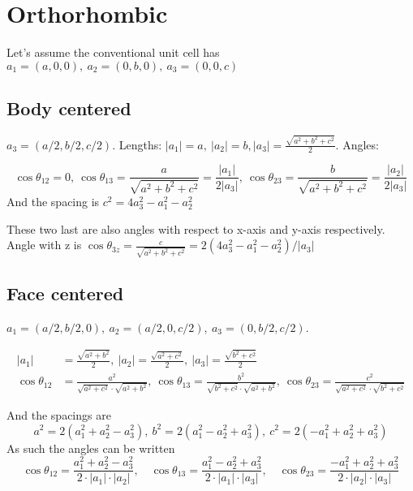 \documentclass[a4paper,10pt]{article} 	%
\numberwithin{equation}{section}
\begin{document}
	\section{Orthorhombic}
	Let's assume the conventional unit cell has $a_1 = (a,0,0),\ a_2 = (0,b,0),\ a_3 = (0,0,c)$
	
	\subsection{Body centered}
	$a_3 = (a/2, b/2, c/2)$. Lengths: $|a_1| = a,\ |a_2| = b, |a_3| = \frac{\sqrt{a^2+b^2+c^2}}{2}$. Angles: 
	
	\begin{equation}
		\cos \theta_{12} = 0,\ \cos \theta_{13} = \frac{a}{\sqrt{a^2+b^2+c^2}} = \frac{|a_1|}{2|a_3|},\ \cos \theta_{23} = \frac{b}{\sqrt{a^2+b^2+c^2}} = \frac{|a_2|}{2|a_3|}
	\end{equation}
	And the spacing is $ c^2 = 4a_3^2-a_1^2-a_2^2 $
	
	These two last are also angles with respect to x-axis and y-axis respectively. Angle with z is $\cos\theta_{3z} = \frac{c}{\sqrt{a^2+b^2+c^2}} = 2(4a_3^2-a_1^2-a_2^2)/|a_3|$
	
	\subsection{Face centered}
	$ a_1 = (a/2,b/2,0), \ a_2 = (a/2,0,c/2), \ a_3 = (0,b/2,c/2) $.
	
	\begin{align} 
	|a_1| &= \frac{\sqrt{a^2+b^2}}{2}, \ |a_2| = \frac{\sqrt{a^2+c^2}}{2}, \ |a_3| = \frac{\sqrt{b^2+c^2}}{2} \\
	\cos \theta_{12} &= \frac{a^2}{\sqrt{a^2+c^2} \cdot \sqrt{a^2+b^2}},\ \cos \theta_{13} = \frac{b^2}{\sqrt{b^2+c^2} \cdot \sqrt{a^2+b^2}},\ \cos \theta_{23} = \frac{c^2}{\sqrt{a^2+c^2} \cdot \sqrt{b^2+c^2}} 
	\end{align}
	
	And the spacings are
	\begin{equation}\label{key}
		a^2 = 2 (a_1^2+a_2^2-a_3^2), \ b^2 = 2(a_1^2-a_2^2+a_3^2), \ c^2 = 2(-a_1^2+a_2^2+a_3^2)
	\end{equation}
	As such the angles can be written
	\begin{equation}\label{key}
		\cos \theta_{12} = \frac{a_1^2+a_2^2-a_3^2}{2 \cdot |a_1| \cdot |a_2|}, \quad
		\cos \theta_{13} = \frac{a_1^2-a_2^2+a_3^2}{2 \cdot |a_1| \cdot |a_3|}, \quad
		\cos \theta_{23} = \frac{-a_1^2+a_2^2+a_3^2}{2 \cdot |a_2| \cdot |a_3|}
	\end{equation}
	
\end{document}
